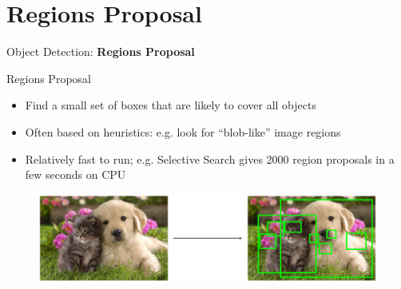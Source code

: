 \section{Regions Proposal}
\begin{frame}{}
    \LARGE Object Detection: \textbf{Regions Proposal}
\end{frame}

\begin{frame}{Regions Proposal}
    \begin{itemize}
        \item Find a small set of boxes that are likely to cover all objects
        \item Often based on heuristics: e.g. look for “blob-like” image regions
        \item Relatively fast to run; e.g. Selective Search gives 2000 region proposals in a few seconds on CPU
    \end{itemize}

    \begin{figure}
        \centering
        \includegraphics[width=1.0\textwidth,height=1.0\textheight,keepaspectratio]{images/object-detect/object_17.png}
    \end{figure}
\end{frame}